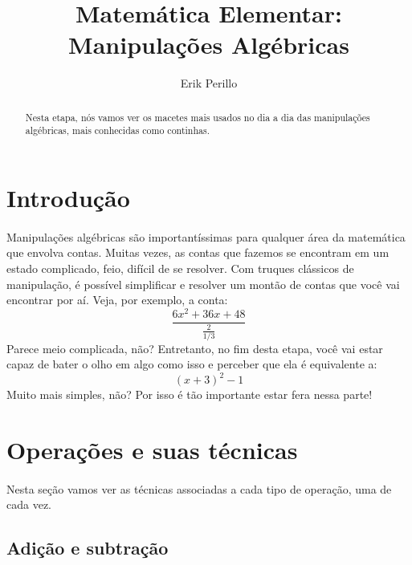 \documentclass[11pt]{article}
\begin{document}
\title{Matemática Elementar: Manipulações Algébricas}
\author{Erik Perillo}
\maketitle
\begin{abstract}
Nesta etapa, nós vamos ver os macetes mais usados no dia a dia das 
manipulações algébricas, mais conhecidas como continhas.
\end{abstract}

\newpage

\tableofcontents

\newpage

\section{Introdução}
\paragraph{}
Manipulações algébricas são importantíssimas para qualquer área da matemática
que envolva contas. Muitas vezes, as contas que fazemos se encontram em um
estado complicado, feio, difícil de se resolver. Com truques clássicos de
manipulação, é possível simplificar e resolver um montão de contas que você
vai encontrar por aí. Veja, por exemplo, a conta:
$$\frac{6x^2 + 36x + 48}{\frac{2}{1/3}}$$
Parece meio complicada, não? Entretanto, no fim desta etapa, você vai estar
capaz de bater o olho em algo como isso e perceber que ela é equivalente a:
$${(x + 3)}^2 - 1$$
Muito mais simples, não? Por isso é tão importante estar fera nessa parte!

\section{Operações e suas técnicas}
\paragraph{}
Nesta seção vamos ver as técnicas associadas a cada tipo de operação, uma de
cada vez.

\subsection{Adição e subtração}
\end{document}
